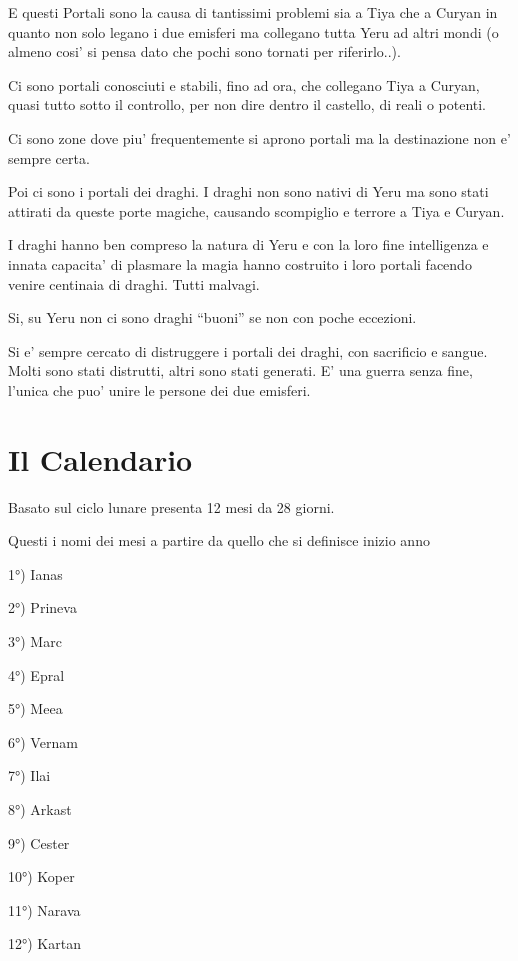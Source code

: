 \documentclass[a4paper,11pt,twoside,openany]{dndbook}
\begin{document}
{E questi Portali sono la causa di tantissimi problemi sia a Tiya che a Curyan in quanto non solo legano i due emisferi ma collegano tutta Yeru ad altri mondi (o almeno cosi' si pensa dato che pochi sono tornati per riferirlo..).

Ci sono portali conosciuti e stabili, fino ad ora, che collegano Tiya a Curyan, quasi tutto sotto il controllo, per non dire dentro il castello, di reali o potenti.

Ci sono zone dove piu' frequentemente si aprono portali ma la destinazione non e' sempre certa.

Poi ci sono i portali dei draghi. I draghi non sono nativi di Yeru ma sono stati attirati da queste porte magiche, causando scompiglio e terrore a Tiya e Curyan.

I draghi hanno ben compreso la natura di Yeru e con la loro fine intelligenza e innata capacita' di plasmare la magia hanno costruito i loro portali facendo venire centinaia di draghi. Tutti malvagi.

Si, su Yeru non ci sono draghi ``buoni'' se non con poche eccezioni.

Si e' sempre cercato di distruggere i portali dei draghi, con sacrificio e sangue. Molti sono stati distrutti, altri sono stati generati. E' una guerra senza fine, l'unica che puo' unire le persone dei due emisferi. 

\pagebreak

\section{Il Calendario}

\label{il-calendario}

Basato sul ciclo lunare presenta 12 mesi da 28 giorni.

Questi i nomi dei mesi a partire da quello che si definisce inizio
anno
\bigskip

1°) Ianas

2°) Prineva

3°) Marc

4°) Epral

5°) Meea

6°) Vernam

7°) Ilai

8°) Arkast

9°) Cester

10°) Koper

11°) Narava

12°) Kartan

}
\end{document}
